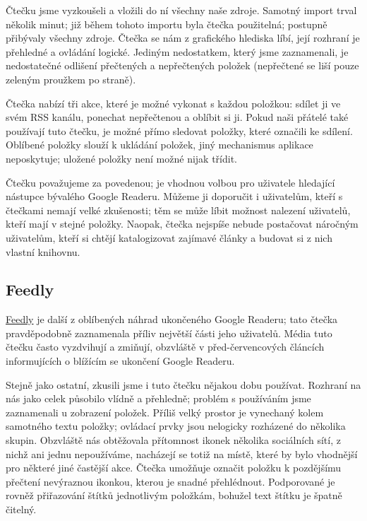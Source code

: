 Čtečku jsme vyzkoušeli a vložili do ní všechny naše zdroje.
Samotný import trval několik minut; již během tohoto importu byla čtečka použitelná; postupně přibývaly všechny zdroje.
Čtečka se nám z grafického hlediska líbí, její rozhraní je přehledné a ovládání logické.
Jediným nedostatkem, který jsme zaznamenali, je nedostatečné odlišení přečtených a nepřečtených položek (nepřečtené se liší pouze zeleným proužkem po straně).

Čtečka nabízí tři akce, které je možné vykonat s každou položkou: sdílet ji ve svém RSS kanálu, ponechat nepřečtenou a oblíbit si ji.
Pokud naši přátelé také používají tuto čtečku, je možné přímo sledovat položky, které označili ke sdílení.
Oblíbené položky slouží k ukládání položek, jiný mechanismus aplikace neposkytuje; uložené položky není možné nijak třídit.

Čtečku považujeme za povedenou; je vhodnou volbou pro uživatele hledající nástupce bývalého Google Readeru.
Můžeme ji doporučit i uživatelům, kteří s čtečkami nemají velké zkušenosti; těm se může líbit možnost nalezení uživatelů, kteří mají v  stejné položky.
Naopak, čtečka nejspíše nebude postačovat náročným uživatelům, kteří si chtějí katalogizovat zajímavé články a budovat si z nich vlastní knihovnu.

\subsection{Feedly}

\href{http://www.feedly.com/}{Feedly} je další z oblíbených náhrad ukončeného Google Readeru; tato čtečka pravděpodobně zaznamenala příliv největší části jeho uživatelů.
Média tuto čtečku často vyzdvihují a zmiňují, obzvláště v před-červencových článcích informujících o blížícím se ukončení Google Readeru.

Stejně jako ostatní, zkusili jsme i tuto čtečku nějakou dobu používat.
Rozhraní na nás jako celek působilo vlídně a přehledně; problém s používáním jsme zaznamenali u zobrazení položek.
Příliš velký prostor je vynechaný kolem samotného textu položky; ovládací prvky jsou nelogicky rozházené do několika skupin.
Obzvláště nás obtěžovala přítomnost ikonek několika sociálních sítí, z nichž ani jednu nepoužíváme, nacházejí se totiž na místě, které by bylo vhodnější pro některé jiné častější akce.
Čtečka umožňuje označit položku k pozdějšímu přečtení nevýraznou ikonkou, kterou je snadné přehlédnout.
Podporované je rovněž přiřazování štítků jednotlivým položkám, bohužel text štítku je špatně čitelný.

